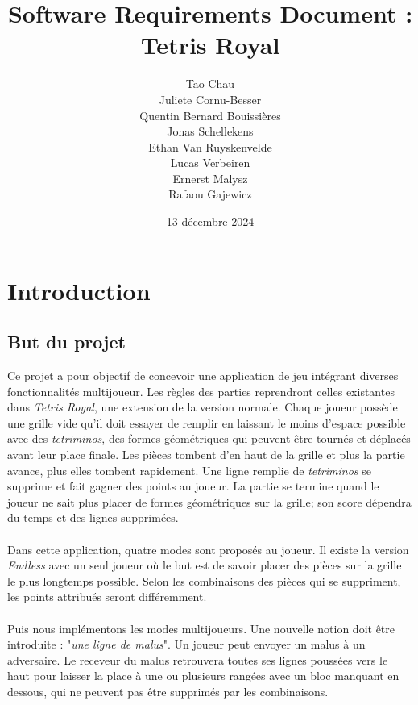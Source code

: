 \documentclass{article}
\title{Software Requirements Document : Tetris Royal}
\author{Tao Chau\\
		Juliete Cornu-Besser\\
		Quentin Bernard Bouissières\\
		Jonas Schellekens\\
		Ethan Van Ruyskenvelde\\
		Lucas Verbeiren\\
		Ernerst Malysz\\
		Rafaou Gajewicz}
\date{ 13 décembre 2024}
\begin{document}
\maketitle

\newpage

\tableofcontents

\newpage

\section{Introduction}

\subsection{But du projet}

\quad Ce projet a pour objectif de concevoir une application de jeu intégrant diverses fonctionnalités multijoueur. Les règles des parties reprendront celles existantes dans \textit{Tetris Royal}, une extension de la version normale. Chaque joueur possède une grille vide qu'il doit essayer de remplir en laissant le moins d'espace possible avec des \textit{tetriminos}, des formes géométriques qui peuvent être tournés et déplacés avant leur place finale. Les pièces tombent d'en haut de la grille et plus la partie avance, plus elles tombent rapidement. Une ligne remplie de  \textit{tetriminos} se supprime et fait gagner des points au joueur. La partie se termine quand le joueur ne sait plus placer de formes géométriques sur la grille; son score dépendra du temps et des lignes supprimées.  

\paragraph*{}

Dans cette application, quatre modes sont proposés au joueur. Il existe la version \textit{Endless} avec un seul joueur où le but est de savoir placer des pièces sur la grille le plus longtemps possible. Selon les combinaisons des pièces qui se suppriment, les points attribués seront différemment.
 
\paragraph*{}

Puis nous implémentons les modes multijoueurs. Une nouvelle notion doit être introduite : "\textit{une ligne de malus}". Un joueur peut envoyer un malus à un adversaire. Le receveur du malus retrouvera toutes ses lignes poussées vers le haut pour laisser la place à une ou plusieurs rangées avec un bloc manquant en dessous, qui ne peuvent pas être supprimés par les combinaisons.  
\end{document}
